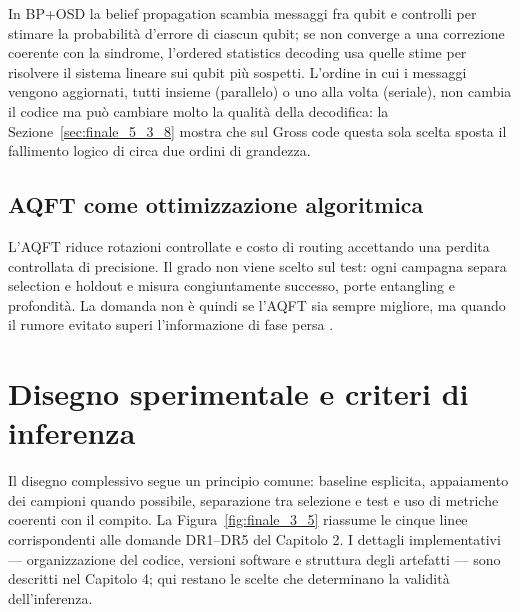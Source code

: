 In BP+OSD la belief propagation scambia messaggi fra qubit e controlli per stimare la probabilità d'errore di ciascun qubit; se non converge a una correzione coerente con la sindrome, l'ordered statistics decoding usa quelle stime per risolvere il sistema lineare sui qubit più sospetti. L'ordine in cui i messaggi vengono aggiornati, tutti insieme (parallelo) o uno alla volta (seriale), non cambia il codice ma può cambiare molto la qualità della decodifica: la Sezione~\ref{sec:finale_5_3_8} mostra che sul Gross code questa sola scelta sposta il fallimento logico di circa due ordini di grandezza.

\subsection{AQFT come ottimizzazione algoritmica}\label{sec:finale_3_4_4}

L'AQFT riduce rotazioni controllate e costo di routing accettando una perdita controllata di precisione. Il grado non viene scelto sul test: ogni campagna separa selection e holdout e misura congiuntamente successo, porte entangling e profondità. La domanda non è quindi se l'AQFT sia sempre migliore, ma quando il rumore evitato superi l'informazione di fase persa \cite{barencoAQFT1996,akoramurthy2026}.
\section{Disegno sperimentale e criteri di inferenza}\label{sec:finale_3_5}

Il disegno complessivo segue un principio comune: baseline esplicita, appaiamento dei campioni quando possibile, separazione tra selezione e test e uso di metriche coerenti con il compito. La Figura~\ref{fig:finale_3_5} riassume le cinque linee corrispondenti alle domande DR1--DR5 del Capitolo 2. I dettagli implementativi --- organizzazione del codice, versioni software e struttura degli artefatti --- sono descritti nel Capitolo 4; qui restano le scelte che determinano la validità dell'inferenza.

